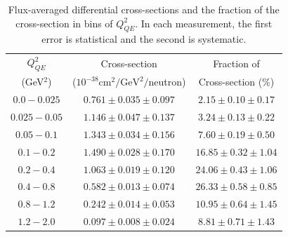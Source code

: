 \begingroup
\squeezetable
\begin{table}
\begin{tabular}{ccc}
$Q^2_{QE}$ & Cross-section  &  Fraction of \\
{(GeV$^2$) }    & {($10^{-38}\mathrm{cm}^2/\mathrm{GeV}^2/$neutron) } &  Cross-section {(\%)} \\ \hline
$0.0 - 0.025$ & $0.761\pm0.035\pm0.097$ &  $2.15\pm0.10\pm0.17$ \\ 
$0.025 - 0.05$ & $1.146\pm0.047\pm0.137$ &  $3.24\pm0.13\pm0.22$ \\ 
$0.05 - 0.1$ & $1.343\pm0.034\pm0.156$ &  $7.60\pm0.19\pm0.50$ \\ 
$0.1 - 0.2$ & $1.490\pm0.028\pm0.170$ &  $16.85\pm0.32\pm1.04$ \\ 
$0.2 - 0.4$ & $1.063\pm0.019\pm0.120$ &  $24.06\pm0.43\pm1.06$ \\ 
$0.4 - 0.8$ & $0.582\pm0.013\pm0.074$ &  $26.33\pm0.58\pm0.85$ \\ 
$0.8 - 1.2$ & $0.242\pm0.014\pm0.053$ &  $10.95\pm0.64\pm1.45$ \\ 
$1.2 - 2.0$ & $0.097\pm0.008\pm0.024$ &  $8.81\pm0.71\pm1.43$ \\ 
\hline
\end{tabular}
\caption{Flux-averaged differential cross-sections and the fraction of the cross-section in bins of $Q^2_{QE}$.  In each measurement, the first error is statistical and the second is systematic.}
\label{tab:xsec}
\end{table}
\endgroup
